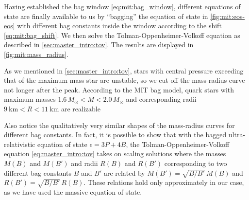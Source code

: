 Having established the bag window \eqref{eq:mit:bag_window},
different equations of state are finally available to us by ``bagging'' the equation of state in \cref{fig:mit:eos-eos}
with different bag constants inside the window according to the shift \eqref{eq:mit:bag_shift}.
We then solve the Tolman-Oppenheimer-Volkoff equation as described in \cref{sec:master_intro:tov}.
The results are displayed in \cref{fig:mit:mass_radius}.

As we mentioned in \cref{sec:master_intro:tov},
stars with central pressure exceeding that of the maximum mass star are unstable,
so we cut off the mass-radius curve not longer after the peak.
According to the MIT bag model,
quark stars with maximum masses $1.6 \, M_\odot < M < 2.0 \, M_\odot$ and corresponding radii $\SI{9}{\kilo\meter} < R < \SI{11}{\kilo\meter}$ are realizable

Also notice the qualitatively very similar shapes of the mass-radius curves for different bag constants.
In fact, it is possible to show that with the bagged ultra-relativistic equation of state $\epsilon = 3P + 4B$,
the Tolman-Oppenheimer-Volkoff equation \eqref{eq:master_intro:tov} takes on scaling solutions
where the masses $M(B)$ and $M(B')$ and radii $R(B)$ and $R(B')$ corresponding to two different bag constants $B$ and $B'$
are related by $M(B') = \sqrt{B/B'} \, M(B)$ and $R(B') = \sqrt{B/B'} \, R(B)$. \cite[equation 8.29]{ref:glendenning}
These relations hold only approximately in our case, as we have used the massive equation of state.
